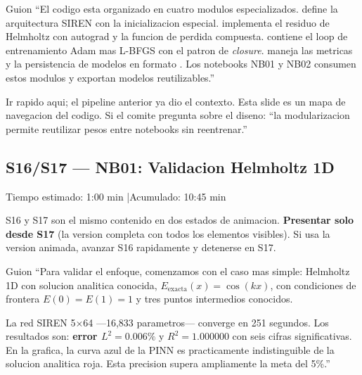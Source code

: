 \begin{slidebox}{Guion}
``El codigo esta organizado en cuatro modulos especializados. 
define la arquitectura SIREN con la inicializacion especial. 
implementa el residuo de Helmholtz con autograd y la funcion de perdida compuesta.
 contiene el loop de entrenamiento Adam mas L-BFGS con el
patron de \emph{closure}.  maneja las metricas y la persistencia
de modelos en formato . Los notebooks NB01 y NB02 consumen estos
modulos y exportan modelos reutilizables.''
\end{slidebox}
\vspace{4pt}

\begin{tipbox}
Ir rapido aqui; el pipeline anterior ya dio el contexto. Esta slide es un
mapa de navegacion del codigo. Si el comite pregunta sobre el diseno:
``la modularizacion permite reutilizar pesos entre notebooks sin reentrenar.''
\end{tipbox}

\vspace{8pt}

\subsection{S16/S17 --- NB01: Validacion Helmholtz 1D}

\begin{timebox}
Tiempo estimado: 1:00 min \quad|\quad Acumulado: 10:45 min
\end{timebox}
\vspace{4pt}

\begin{warningbox}
S16 y S17 son el mismo contenido en dos estados de animacion. \textbf{Presentar
solo desde S17} (la version completa con todos los elementos visibles).
Si usa la version animada, avanzar S16 rapidamente y detenerse en S17.
\end{warningbox}
\vspace{4pt}

\begin{slidebox}{Guion}
``Para validar el enfoque, comenzamos con el caso mas simple: Helmholtz 1D con
solucion analitica conocida, $E_\text{exacta}(x) = \cos(kx)$, con condiciones
de frontera $E(0) = E(1) = 1$ y tres puntos intermedios conocidos.

La red SIREN 5$\times$64 ---16,833 parametros--- converge en 251 segundos.
Los resultados son: \textbf{error $L^2 = 0.006\%$} y \textbf{$R^2 = 1.000000$}
con seis cifras significativas. En la grafica, la curva azul de la PINN es
practicamente indistinguible de la solucion analitica roja. Esta precision
supera ampliamente la meta del 5\%.''
\end{slidebox}
\vspace{4pt}

